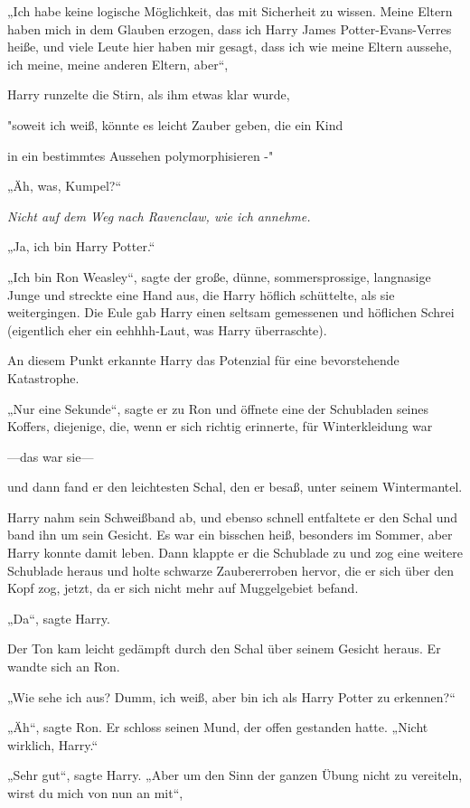 {„Ich habe keine logische Möglichkeit, das mit Sicherheit zu wissen. Meine Eltern haben mich in dem Glauben erzogen, dass ich Harry James Potter-Evans-Verres heiße, und viele Leute hier haben mir gesagt, dass ich wie meine Eltern aussehe, ich meine, meine anderen Eltern, aber“,

Harry runzelte die Stirn, als ihm etwas klar wurde,

"soweit ich weiß, könnte es leicht Zauber geben, die ein Kind

in ein bestimmtes Aussehen polymorphisieren -"

„Äh, was, Kumpel?“

\emph{Nicht auf dem Weg nach Ravenclaw, wie ich annehme.}

„Ja, ich bin Harry Potter.“

„Ich bin Ron Weasley“, sagte der große, dünne, sommersprossige, langnasige Junge und streckte eine Hand aus, die Harry höflich schüttelte, als sie weitergingen. Die Eule gab Harry einen seltsam gemessenen und höflichen Schrei (eigentlich eher ein eehhhh-Laut, was Harry überraschte).

An diesem Punkt erkannte Harry das Potenzial für eine bevorstehende Katastrophe.

„Nur eine Sekunde“, sagte er zu Ron und öffnete eine der Schubladen seines Koffers, diejenige, die, wenn er sich richtig erinnerte, für Winterkleidung war

—das war sie—

und dann fand er den leichtesten Schal, den er besaß, unter seinem Wintermantel.

Harry nahm sein Schweißband ab, und ebenso schnell entfaltete er den Schal und band ihn um sein Gesicht. Es war ein bisschen heiß, besonders im Sommer, aber Harry konnte damit leben. Dann klappte er die Schublade zu und zog eine weitere Schublade heraus und holte schwarze Zaubererroben hervor, die er sich über den Kopf zog, jetzt, da er sich nicht mehr auf Muggelgebiet befand.

„Da“, sagte Harry.

Der Ton kam leicht gedämpft durch den Schal über seinem Gesicht heraus. Er wandte sich an Ron.

„Wie sehe ich aus? Dumm, ich weiß, aber bin ich als Harry Potter zu erkennen?“

„Äh“, sagte Ron. Er schloss seinen Mund, der offen gestanden hatte. „Nicht wirklich, Harry.“

„Sehr gut“, sagte Harry. „Aber um den Sinn der ganzen Übung nicht zu vereiteln, wirst du mich von nun an mit“,

}
